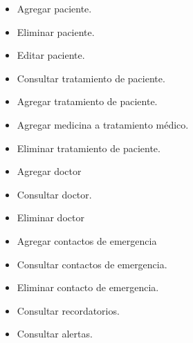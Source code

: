 \begin{itemize}
\begin{itemize}
		
		\item Agregar paciente.
		\item Eliminar paciente.
		\item Editar paciente.
		\item Consultar tratamiento de paciente.
		\item Agregar tratamiento de paciente.
		\item Agregar medicina a tratamiento médico.
		\item Eliminar tratamiento de paciente.
		\item Agregar doctor
		\item Consultar doctor.
		\item Eliminar doctor
		\item Agregar contactos de emergencia
		\item Consultar contactos de emergencia.
		\item Eliminar contacto de emergencia.
		\item Consultar recordatorios.
		\item Consultar alertas.
%		
	\end{itemize}
\end{itemize}


